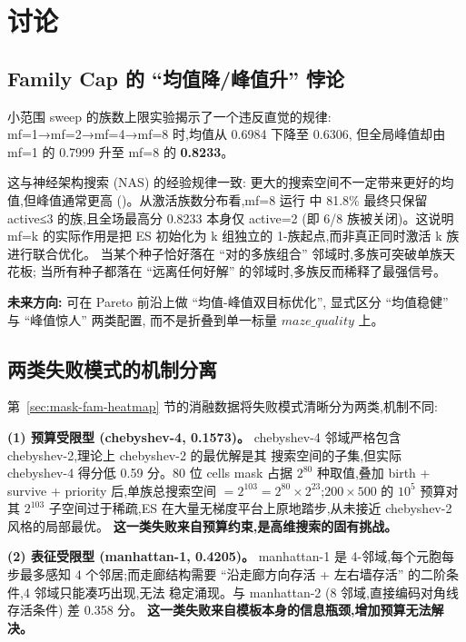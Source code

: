 
\section{讨论}
\label{sec:discussion}

\subsection{Family Cap 的 ``均值降/峰值升'' 悖论}
\label{sec:mf-paradox}

小范围 sweep 的族数上限实验揭示了一个违反直觉的规律:
mf=1→mf=2→mf=4→mf=8 时,均值从 0.6984 下降至 0.6306,
但全局峰值却由 mf=1 的 0.7999 升至 mf=8 的 \textbf{0.8233}。

这与神经架构搜索 (NAS) 的经验规律一致:
更大的搜索空间不一定带来更好的均值,但峰值通常更高
(\cite{liu2018darts, real2019regularized})。从激活族数分布看,mf=8 运行
中 81.8\% 最终只保留 active≤3 的族,且全场最高分 0.8233 本身仅 active=2
(即 6/8 族被关闭)。这说明 mf=k 的实际作用是把 ES 初始化为 k 组独立的
1-族起点,而非真正同时激活 k 族进行联合优化。
当某个种子恰好落在 ``对的多族组合'' 邻域时,多族可突破单族天花板;
当所有种子都落在 ``远离任何好解'' 的邻域时,多族反而稀释了最强信号。

\medskip\noindent\textbf{未来方向:}
可在 Pareto 前沿上做 ``均值-峰值双目标优化'',
显式区分 ``均值稳健'' 与 ``峰值惊人'' 两类配置,
而不是折叠到单一标量 $maze\_quality$ 上。

\subsection{两类失败模式的机制分离}
\label{sec:fail-modes}

第~\ref{sec:mask-fam-heatmap} 节的消融数据将失败模式清晰分为两类,机制不同:

\noindent\textbf{(1) 预算受限型 (chebyshev-4, 0.1573)。}
chebyshev-4 邻域严格包含 chebyshev-2,理论上 chebyshev-2 的最优解是其
搜索空间的子集,但实际 chebyshev-4 得分低 0.59 分。80 位 cells mask 占据
$2^{80}$ 种取值,叠加 birth + survive + priority 后,单族总搜索空间
$=2^{103} = 2^{80}\times 2^{23}$;$200\!\times\!500$ 的 $10^5$ 预算对其
$2^{103}$ 子空间过于稀疏,ES 在大量无梯度平台上原地踏步,从未接近
chebyshev-2 风格的局部最优。
\textbf{这一类失败来自预算约束,是高维搜索的固有挑战。}

\noindent\textbf{(2) 表征受限型 (manhattan-1, 0.4205)。}
manhattan-1 是 4-邻域,每个元胞每步最多感知 4 个邻居;而走廊结构需要
``沿走廊方向存活 + 左右墙存活'' 的二阶条件,4 邻域只能凑巧出现,无法
稳定涌现。与 manhattan-2 (8 邻域,直接编码对角线存活条件) 差 0.358 分。
\textbf{这一类失败来自模板本身的信息瓶颈,增加预算无法解决。}

